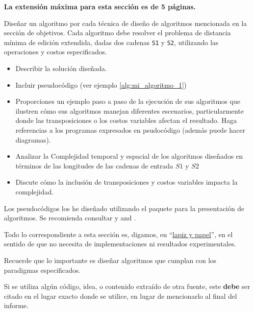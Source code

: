 \begin{mdframed}
    \textbf{La extensión máxima para esta sección es de 5 páginas.}
\end{mdframed}

Diseñar un algoritmo por cada técnica de diseño de algoritmos mencionada en la sección de objetivos. Cada algoritmo debe resolver el problema de distancia mínima de edición extendida, dadas dos cadenas \texttt{S1} y \texttt{S2}, utilizando las operaciones y costos especificados.

\begin{itemize}
    \item Describir la solución diseñada. 
    \item Incluir pseudocódigo (ver ejemplo \cref{alg:mi_algoritmo_1})
    \item Proporciones un ejemplo paso a paso de la ejecución de sus algoritmos que ilustren cómo sus algoritmos manejan diferentes escenarios, particularmente donde las
    transposiciones o los costos variables afectan el
    resultado. Haga referencias a los programas expresados en psudocódigo (además puede hacer diagramas).
    \item Analizar la Complejidad temporal y espacial de los algoritmos diseñados en términos de las longitudes de las cadenas de entrada $S1$ y $S2$
    \item Discute cómo la inclusión de transposiciones y costos   variables impacta la complejidad.
\end{itemize}

Los pseudocódigos los he diseñado utilizando el 
paquete  \cite{algorithm2e} para la presentación de algoritmos. Se recomienda consultar  \cite{ctan-algorithm2e} y  \cite{overleaf-algorithms} 
and  \cite{LevenshteinDistance}.

Todo lo correspondiente a esta sección es, digamos, en ``\href{https://dle.rae.es/metáfora}{lapiz y papel}'', en el sentido de que no necesita de implementaciones ni resultados experimentales. 

\begin{mdframed}
    Recuerde que lo importante es diseñar algoritmos que cumplan con los paradigmas especificados. 
\end{mdframed}

\begin{mdframed}
    Si se utiliza algún código, idea, o contenido extraído de otra fuente, este \textbf{debe} ser citado en el lugar exacto donde se utilice, en lugar de mencionarlo al final del informe. 
\end{mdframed}

